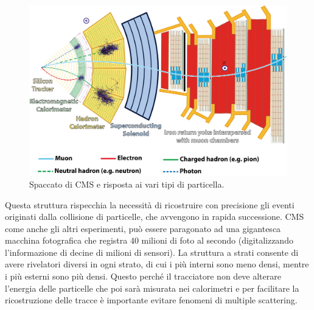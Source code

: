 \begin{figure}
\centering
\includegraphics[scale=0.8]{Immagini/CMSbis}
\caption{Spaccato di CMS e risposta ai vari tipi di particella.}
\label{CMSbis}
\end{figure}

Questa struttura rispecchia la necessità di ricostruire con precisione gli eventi originati dalla collisione di particelle, che avvengono in rapida successione. CMS come anche gli altri esperimenti, può essere paragonato ad una gigantesca macchina fotografica che registra 40 milioni di foto al secondo (digitalizzando l'informazione di decine di milioni di sensori). 
La struttura a strati consente di avere rivelatori diversi in ogni strato, di cui i più interni sono meno densi, mentre i più esterni sono più densi. Questo perché il tracciatore non deve alterare l'energia delle particelle che poi sarà misurata nei calorimetri e per facilitare la ricostruzione delle tracce è importante evitare fenomeni di multiple scattering.

